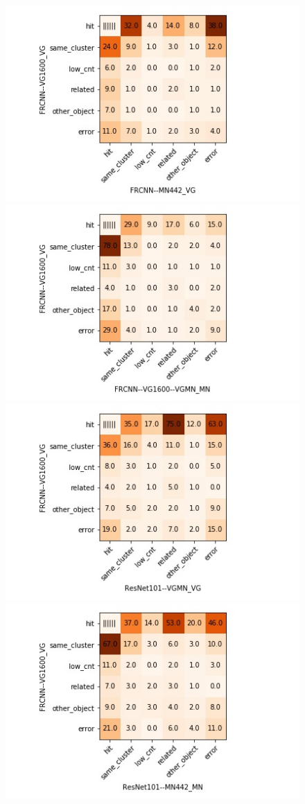 \begin{figure}[t]
	\includegraphics[scale=.5]{images/matrix_FRCNN--VG1600_VG_FRCNN--MN442_VG.jpg}
	\includegraphics[scale=.5]{images/matrix_FRCNN--VG1600_VG_FRCNN--VG1600--VGMN_MN.jpg}
	\includegraphics[scale=.5]{images/matrix_FRCNN--VG1600_VG_ResNet101--VGMN_VG.jpg}
	\includegraphics[scale=.5]{images/matrix_FRCNN--VG1600_VG_ResNet101--MN442_MN.jpg}
	

\end{figure}
